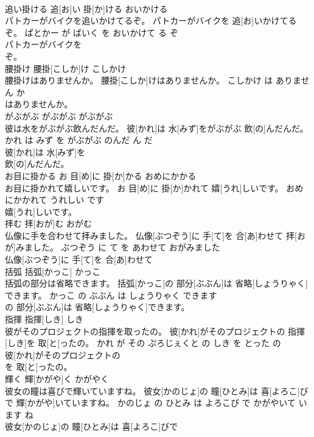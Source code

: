 \documentclass[8pt]{extreport}
\begin{document}
\begin{CJK}{UTF8}{min}
\\	追い掛ける	追[お]い 掛[か]ける	おいかける	
\\	パトカーがバイクを追いかけてるぞ。	パトカーがバイクを 追[お]いかけてるぞ。	ぱとかー が ばいく を おいかけて る ぞ	
\\	パトカーがバイクを
\\	ぞ。			
\\	腰掛け	腰掛[こしか]け	こしかけ	
\\	腰掛けはありませんか。	腰掛[こしか]けはありませんか。	こしかけ は ありません か	
\\	はありませんか。			
\\	がぶがぶ	がぶがぶ	がぶがぶ	
\\	彼は水をがぶがぶ飲んだんだ。	彼[かれ]は 水[みず]をがぶがぶ 飲[の]んだんだ。	かれ は みず を がぶがぶ のんだ ん だ	
\\	彼[かれ]は 水[みず]を
\\	飲[の]んだんだ。			
\\	お目に掛かる	お 目[め]に 掛[か]かる	おめにかかる	
\\	お目に掛かれて嬉しいです。	お 目[め]に 掛[か]かれて 嬉[うれ]しいです。	おめにかかれて うれしい です	
\\	嬉[うれ]しいです。			
\\	拝む	拝[おが]む	おがむ	
\\	仏像に手を合わせて拝みました。	仏像[ぶつぞう]に 手[て]を 合[あ]わせて 拝[おが]みました。	ぶつぞう に て を あわせて おがみました	
\\	仏像[ぶつぞう]に 手[て]を 合[あ]わせて
\\	括弧	括弧[かっこ]	かっこ	
\\	括弧の部分は省略できます。	括弧[かっこ]の 部分[ぶぶん]は 省略[しょうりゃく]できます。	かっこ の ぶぶん は しょうりゃく できます	
\\	の 部分[ぶぶん]は 省略[しょうりゃく]できます。			
\\	指揮	指揮[しき]	しき	
\\	彼がそのプロジェクトの指揮を取ったの。	彼[かれ]がそのプロジェクトの 指揮[しき]を 取[と]ったの。	かれ が その ぷろじぇくと の しき を とった の	
\\	彼[かれ]がそのプロジェクトの
\\	を 取[と]ったの。			
\\	輝く	輝[かがや]く	かがやく	
\\	彼女の瞳は喜びで輝いていますね。	彼女[かのじょ]の 瞳[ひとみ]は 喜[よろこ]びで 輝[かがや]いていますね。	かのじょ の ひとみ は よろこび で かがやいて います ね	
\\	彼女[かのじょ]の 瞳[ひとみ]は 喜[よろこ]びで

\end{CJK}
\end{document}

